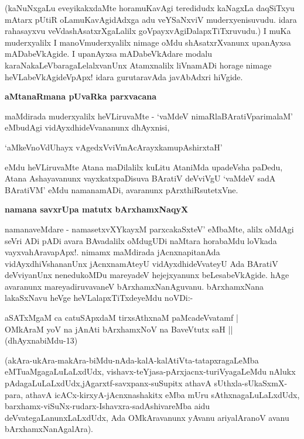 \noindent
(kaNuNxgaLu eveyikakxdaMte horamuKavAgi teredidudx kaNagxLa daqSiTxyu mAtarx pUtiR oLamuKavAgi\-dAdxga adu veYSaNxviV muderxyenisuvudu. idara rahasayxvu veVdashAsatxrXgaLalilx goVpayxvAgiDalapxTiTxruvudu.) I muKa muderxyalilx I manoVmuderxyalilx nimage oMdu shAsatxrXvanunx upanAyxsa mADabeVkAgide. I upanAyxsa mADabeVkAdare modalu karaNakaLeVbaragaLelalxvanUnx Atamxnalilx liVnamADi horage nimage heVLabeVkAgideVpApx! idara gurutaravAda javAbAdxri hiVgide.

{\bigskip
\noindent
{\large\bf aMtanaRmana pUvaRka parxvacana}}\label{page83}
\medskip

\noindent
maMdirada muderxyalilx heVLiruvaMte - `vaMdeV nimaRlaBAratiVparimalaM' eMbudAgi vidAyxdhi\-deVva\-nanunx dhAyxnisi,

\begin{shloka}
`aMkeVnoVdUhayx vAgedxVviVmAcArayxkamupAshirxtaH'
\end{shloka}

\noindent
eMdu heVLiruvaMte Atana maDilalilx kuLitu AtaniMda upadeVsha paDedu, Atana Ashayavanunx vayxkatx\-paDi\-suva BAratiV deVviVgU `vaMdeV sadA BAratiVM' eMdu namanamADi, avaranunx pArxthiRsutetxVne.

{\bigskip
\noindent
{\large\bf namana savxrUpa matutx bArxhamxNaqyX}}\label{page84}
\medskip

\noindent
namanaveMdare - namasetxvXYkayxM parxcakaSxteV' eMbaMte, alilx oMdAgi seVri ADi pADi avara BAvadalilx oMdu\-gUDi naMtara horabaMdu loVkada vayxvahAravapApx!. nimamx maMdirada jAcnxnapitanAda vidAyxdhiVsha\-nanUnx jAcnxnamAteyU vidAyxdhideVvateyU Ada BAratiV deVviyanUnx nenedukoMDu mareyadeV hejejx\-yanunx beLesabeVkAgide. hAge avaranunx mareyadiruvavaneV bArxhamxNanAguvanu. bArxhamxNana lakaSxNavu heVge heVLalapxTiTxdeyeMdu noVDi:-

\begin{shloka}
aSATxMgaM ca catuSApxdaM tirxsAthxnaM paMcadeVvatamf |\\\label{48}
OMkAraM yoV na jAnAti bArxhamxNoV na BaveVtutx saH ||\\
\hfill{(dhAyxnabiMdu-13)}
\end{shloka}

\noindent
(akAra-ukAra-makAra-biMdu-nAda-kalA-kalAtiVta-tatapxragaLeMba eMTu\break aMgagaLuLaLxdUdx, vi\-shavx-teYjasa-pArxjacnx-turiVyagaLeMdu nAlukx pAdagaLuLaLxdUdx,\break jAgarxtf-savxpanx-suSupitx athavA sUthxla-sU\-kaSxmX-\-para, athavA icACx-kirxyA-jAcnxna\-shakitx eMba mUru sAthxnagaLuLaLxdUdx, barxhamx-viSuNx-rudarx-Ishavxra-sa\-dA\-shiva\-reMba aidu deVvategaLanunxLaLxdUdx, Ada OMkAravanunx yAvanu ariyalAranoV avanu bArxhamxNa\-nAga\-lAra).

